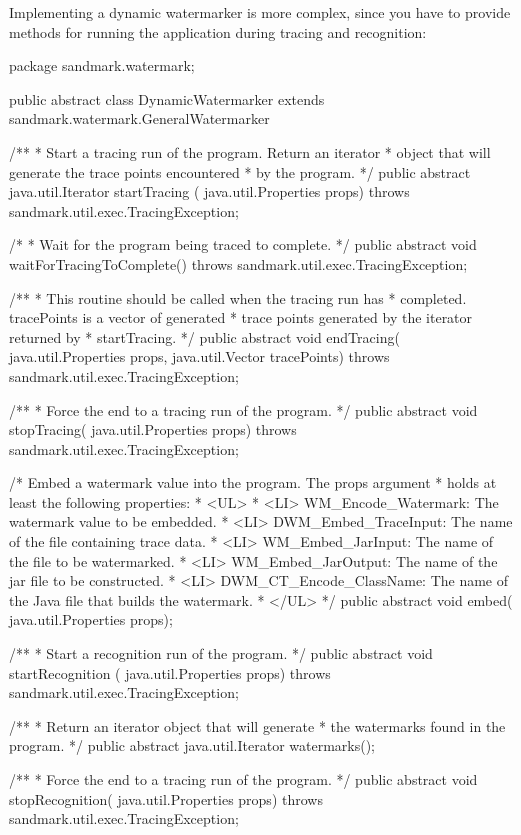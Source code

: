 Implementing a dynamic watermarker is more complex,
since you have to provide methods for running the
application during tracing and recognition:
\begin{listing}{1}
package sandmark.watermark;

public abstract class DynamicWatermarker 
   extends sandmark.watermark.GeneralWatermarker {

/**
 * Start a tracing run of the program. Return an iterator
 * object that will generate the trace points encountered
 * by the program.
 */
public abstract java.util.Iterator startTracing (
    java.util.Properties props) throws sandmark.util.exec.TracingException;

/*
 * Wait for the program being traced to complete.
 */
public abstract void waitForTracingToComplete() 
   throws sandmark.util.exec.TracingException;

/**
 * This routine should be called when the tracing run has
 * completed. tracePoints is a vector of generated 
 * trace points generated by the iterator returned by
 * startTracing.
 */
public abstract void endTracing(
    java.util.Properties props,
    java.util.Vector tracePoints) throws sandmark.util.exec.TracingException;

/**
 * Force the end to a tracing run of the program.
 */
public abstract void stopTracing(
    java.util.Properties props) throws sandmark.util.exec.TracingException;


/* Embed a watermark value into the program. The props argument
 * holds at least the following properties:
 *  <UL>
 *     <LI> WM_Encode_Watermark: The watermark value to be embedded.
 *     <LI> DWM_Embed_TraceInput: The name of the file containing trace data.
 *     <LI> WM_Embed_JarInput: The name of the file to be watermarked.
 *     <LI> WM_Embed_JarOutput: The name of the jar file to be constructed.
 *     <LI> DWM_CT_Encode_ClassName: The name of the Java file that builds the watermark.
 *  </UL>
 */
public abstract void embed(
   java.util.Properties props);

/**
 * Start a recognition run of the program.
 */
public abstract void startRecognition (
    java.util.Properties props) throws sandmark.util.exec.TracingException;

/**
 * Return an iterator object that will generate 
 * the watermarks found in the program.
 */
public abstract java.util.Iterator watermarks();

/**
 * Force the end to a tracing run of the program.
 */
public abstract void stopRecognition(
    java.util.Properties props) throws sandmark.util.exec.TracingException;

}
\end{listing}
